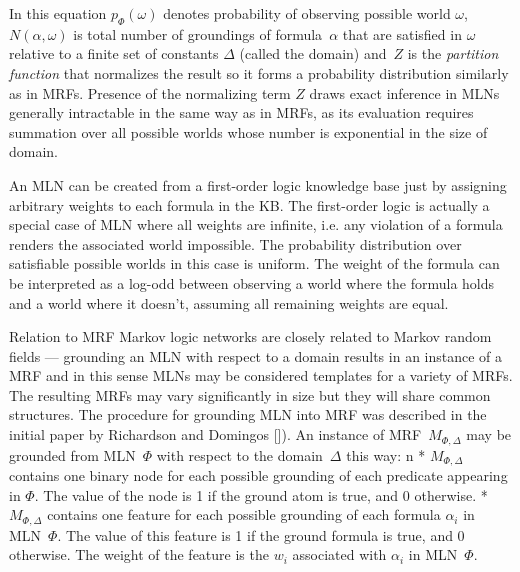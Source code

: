 In this equation $p_{\Phi}(\omega)$ denotes probability of observing possible world $\omega$, $N(\alpha,\omega)$ is total number of groundings of formula~$\alpha$ that are satisfied in $\omega$ relative to a finite set of constants $\Delta$ (called the domain) and~$Z$ is the {\em partition function} that normalizes the result so it forms a probability distribution similarly as in MRFs. Presence of the normalizing term $Z$ draws exact inference in MLNs generally intractable in the same way as in MRFs, as its evaluation requires summation over all possible worlds whose number is exponential in the size of domain.
\par 
An MLN can be created from a first-order logic knowledge base just by assigning arbitrary weights to each formula in the KB. The first-order logic is actually a special case of MLN where all weights are infinite, i.e. any violation of a formula renders the associated world impossible. The probability distribution over satisfiable possible worlds in this case is uniform. The weight of the formula can be interpreted as a log-odd between observing a world where the formula holds and a world where it doesn't, assuming all remaining weights are equal.

\secc Relation to MRF
Markov logic networks are closely related to Markov random fields --- grounding an MLN with respect to a domain results in an instance of a MRF and in this sense MLNs may be considered templates for a variety of MRFs. The resulting MRFs may vary significantly in size but they will share common structures.
The procedure for grounding MLN into MRF was described in the initial paper by Richardson and Domingos [\rcite[Richardson2006]]). An instance of MRF~$M_{\Phi, \Delta}$ may be grounded from MLN~$\Phi$ with respect to the domain~$\Delta$ this way:
\begitems \style n
* $M_{\Phi,\Delta}$ contains one binary node for each possible grounding of each
predicate appearing in $\Phi$. The value of the node is 1 if the ground atom
is true, and 0 otherwise.
* $M_{\Phi,\Delta}$ contains one feature for each possible grounding of each formula
$\alpha_i$ in MLN~$\Phi$. The value of this feature is 1 if the ground formula is true, and 0
otherwise. The weight of the feature is the $w_i$ associated with $\alpha_i$ in MLN~$\Phi$.
\enditems



